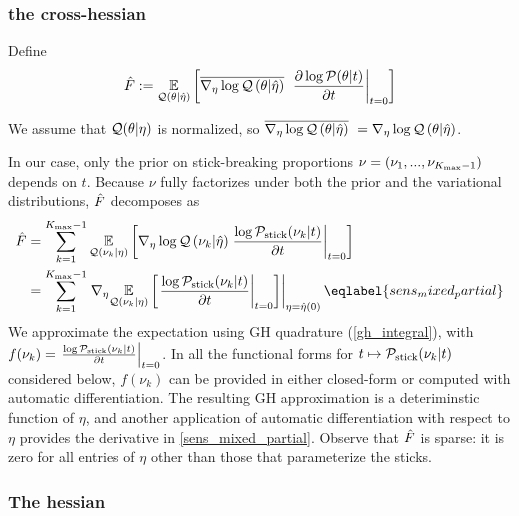 
\subsubsection*{the cross-hessian}


Define
\begin{align*}
\hat F :=   \underset{\mathcal{Q}(\theta \vert \hat\eta)}{\mathbb{E}}\left[
      \overline{{\nabla_\eta \log \mathcal{Q}}\left(\theta \vert \hat\eta\right)}\,\,
      \left.\frac{\partial \log \mathcal{P}(\theta \vert t)}{\partial t}\right\vert_{t=0}
  \right]
\end{align*}


We assume that $\mathcal{Q}(\theta \vert \eta)$ is normalized, so
$\overline{{\nabla_\eta \log \mathcal{Q}}\left(\theta \vert \hat\eta\right)}\,\, = {\nabla_\eta \log \mathcal{Q}}\left(\theta \vert \hat\eta\right)$.

In our case, only the prior on stick-breaking proportions
$\nu = (\nu_1, ..., \nu_{{K_{\mathrm{max}}} - 1})$ depends on $t$.
Because $\nu$ fully factorizes under both the prior and the variational distributions,
$\hat F$ decomposes as
\begin{align}
  \crosshessian &=
  \sum_{\k=1}^{\kmax - 1}
          \expect{\q(\nuk \vert \eta)}
                 {
                 \lqgrad{\nuk \vert \etaopt}
                 \fracat{\log \pstick(\nuk \vert \t)}{\partial \t}{\t = 0}
                 } \notag\\
  &= \sum_{\k=1}^{\kmax - 1}
         \evalat{\nabla_\eta \expect{\q(\nuk \vert \eta)}
                {
                \fracat{\log \pstick(\nuk \vert \t)}{\partial \t}{\t = 0}
                }}{\eta = \etaopt(0)}
\eqlabel{sens_mixed_partial}
\end{align}
We approximate the expectation using GH quadrature (\eqref{gh_integral}),
with
$f(\nu_k) = \left.\frac{\log \mathcal{P}_{\mathrm{stick}}(\nu_{k} \vert t)}{\partial t}\right\vert_{t = 0}$.
In all the functional forms for
$t \mapsto \mathcal{P}_{\mathrm{stick}}(\nu_{k} \vert t)$ considered below,
$f(\nu_k)$ can be provided in either closed-form or computed with automatic differentiation.
The resulting GH approximation is a deteriminstic function of $\eta$,
and another application of automatic differentiation with respect to $\eta$
provides the derivative in \eqref{sens_mixed_partial}.
Observe that $\hat F$ is sparse:
it is zero for all entries of
$\eta$ other than those that parameterize the sticks.

\subsubsection*{The hessian}

